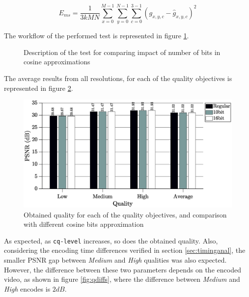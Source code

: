 \begin{equation} \label{eq:emss}
    E_{ms} = \frac{1}{3kMN}\sum^{M-1}_{x=0} \sum^{N-1}_{y=0} \sum_{c=0}^{3-1} \left(g_{x,y,c} - \hat{g}_{x,y,c}\right)^2
\end{equation}

The workflow of the performed test is represented in figure \ref{fig:compcosbit}.

\begin{figure}[!htbp]
    \centering
    
    \caption{Description of the test for comparing impact of number of bits in cosine approximations}
    \label{fig:compcosbit}
\end{figure}

The average results from all resolutions, for each of the quality objectives is represented in figure \ref{fig:compcosbitavg}.

\begin{figure}[!htpb]
    \centering
    \includegraphics[width=\textwidth]{Sections/3Transforms/Images/compcosbitAvg.eps}
    \caption{Obtained quality for each of the quality objectives, and comparison with different cosine bits approximation}
    \label{fig:compcosbitavg}
\end{figure}

As expected, as \texttt{cq-level} increases, so does the obtained quality. Also, considering the encoding time differences verified in section \ref{sec:timinganal}, the smaller PSNR gap between \emph{Medium} and \emph{High} qualities was also expected. However, the difference between these two parameters depends on the encoded video, as shown in figure \ref{fig:qdiffs}, where the difference between \emph{Medium} and \emph{High} encodes is $2 dB$.

